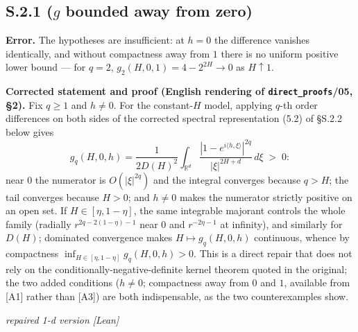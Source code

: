 \documentclass[11pt]{article}
\theoremstyle{definition}
\theoremstyle{remark}
\newcommand{\statustag}[1]{%
  \par\nobreak\begingroup\footnotesize\itshape\raggedleft #1\par\endgroup}
\newcommand{\Wlean}{[Lean]}
\begin{document}
\smallskip{}

\subsection{S.2.1 ($g$ bounded away from zero)}
\textbf{Error.} The hypotheses are insufficient: at $h=0$ the difference
vanishes identically, and without compactness away from $1$ there is no
uniform positive lower bound --- for $q=2$,
$g_2(H,0,1)=4-2^{2H}\to0$ as $H\uparrow1$.

\textbf{Corrected statement and proof (English rendering of
\texttt{direct\_proofs}/05, \S2).} Fix $q\ge1$ and $h\neq0$. For the
constant-$H$ model, applying $q$-th order differences on both sides of the
corrected spectral representation (5.2) of \S S.2.2 below gives
\[
g_q(H,0,h)=\frac{1}{2D(H)^{2}}
\int_{\mathbb R^{d}}\frac{|1-e^{i\langle h,\xi\rangle}|^{2q}}{|\xi|^{2H+d}}
\,d\xi\;>\;0 :
\]
near $0$ the numerator is $O(|\xi|^{2q})$ and the integral converges because
$q>H$; the tail converges because $H>0$; and $h\neq0$ makes the numerator
strictly positive on an open set. If $H\in[\eta,1-\eta]$, the same
integrable majorant controls the whole family (radially
$r^{2q-2(1-\eta)-1}$ near $0$ and $r^{-2\eta-1}$ at infinity), and similarly
for $D(H)$; dominated convergence makes $H\mapsto g_q(H,0,h)$ continuous,
whence by compactness
$\inf_{H\in[\eta,1-\eta]}g_q(H,0,h)>0$. This is a direct repair that does
not rely on the conditionally-negative-definite kernel theorem quoted in the
original; the two added conditions ($h\neq0$; compactness away from $0$ and
$1$, available from [A1] rather than [A3]) are both indispensable, as the
two counterexamples show.
\statustag{repaired 1-d version \Wlean}

\smallskip{}
\end{document}
